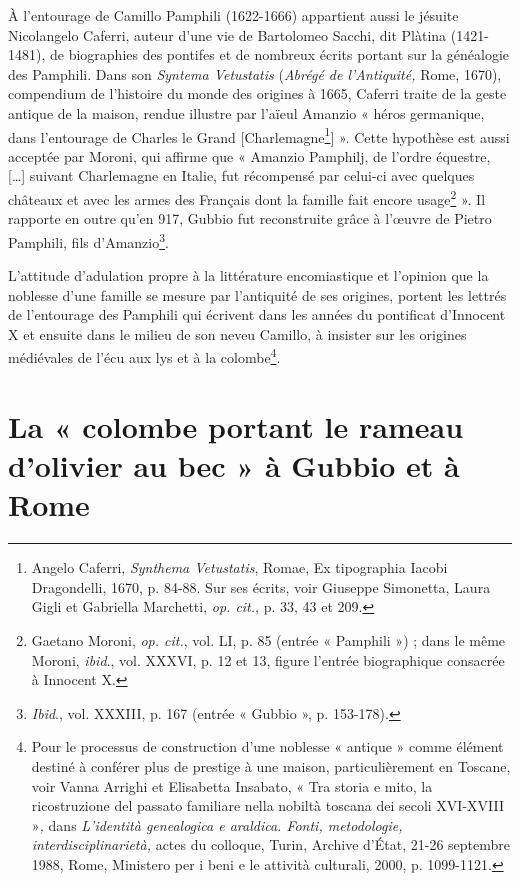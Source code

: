 \documentclass[12pt,twoside,openany]{book}
\begin{document}
À l’entourage de Camillo Pamphili (1622-1666) appartient aussi le jésuite Nicolangelo Caferri, auteur d’une vie de Bartolomeo Sacchi, dit Plàtina (1421-1481), de biographies des pontifes et de nombreux écrits portant sur la généalogie des Pamphili. Dans son \textit{Syntema Vetustatis} (\textit{Abrégé de l’Antiquité,} Rome, 1670), compendium de l’histoire du monde des origines à 1665, Caferri traite de la geste antique de la maison, rendue illustre par l’aïeul Amanzio « héros germanique, dans l’entourage de Charles le Grand [Charlemagne\footnote{Angelo Caferri, \textit{Synthema Vetustatis}, Romae, Ex tipographia Iacobi Dragondelli, 1670, p. 84-88. Sur ses écrits, voir Giuseppe Simonetta, Laura Gigli et Gabriella Marchetti,\textit{ op. cit.}, p. 33, 43 et 209.}] ». Cette hypothèse est aussi acceptée par Moroni, qui affirme que « Amanzio Pamphilj, de l’ordre équestre, […] suivant Charlemagne en Italie, fut récompensé par celui-ci avec quelques châteaux et avec les armes des Français dont la famille fait encore usage\footnote{Gaetano Moroni, \textit{op. cit.}, vol. LI, p. 85 (entrée « Pamphili ») ; dans le même Moroni, \textit{ibid}., vol. XXXVI, p. 12 et 13, figure l’entrée biographique consacrée à Innocent X.} ». Il rapporte en outre qu’en 917, Gubbio fut reconstruite grâce à l’œuvre de Pietro Pamphili, fils d’Amanzio\footnote{\textit{Ibid}., vol. XXXIII, p. 167 (entrée « Gubbio », p. 153-178).}.

L’attitude d’adulation propre à la littérature encomiastique et l’opinion que la noblesse d’une famille se mesure par l’antiquité de ses origines, portent les lettrés de l’entourage des Pamphili qui écrivent dans les années du pontificat d’Innocent X et ensuite dans le milieu de son neveu Camillo, à insister sur les origines médiévales de l’écu aux lys et à la colombe\footnote{Pour le processus de construction d’une noblesse « antique » comme élément destiné à conférer plus de prestige à une maison, particulièrement en Toscane, voir Vanna Arrighi et Elisabetta Insabato, « Tra storia e mito, la ricostruzione del passato familiare nella nobiltà toscana dei secoli XVI-XVIII »\textit{, }dans \textit{L’identità genealogica e araldica. Fonti, metodologie, interdisciplinarietà, }actes du colloque, Turin, Archive d’État, 21-26 septembre 1988, Rome, Ministero per i beni e le attività culturali, 2000, p. 1099-1121.}.

\section{La « colombe portant le rameau d’olivier au bec » à Gubbio et à Rome}
\end{document}
